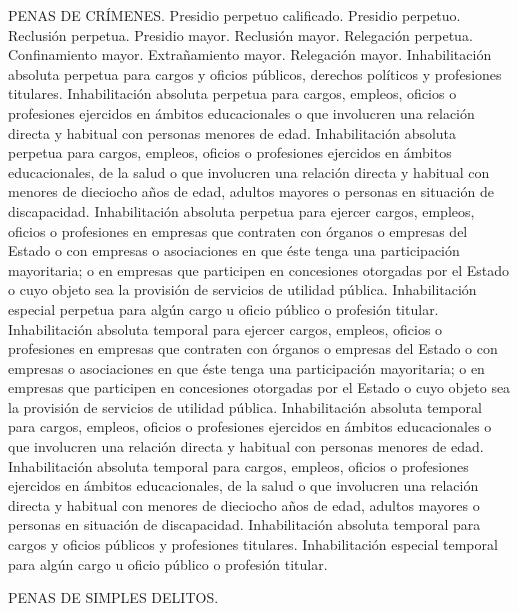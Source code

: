     PENAS DE CRÍMENES.
    Presidio perpetuo calificado.
    Presidio perpetuo.
    Reclusión perpetua.
    Presidio mayor.
    Reclusión mayor.
    Relegación perpetua.
    Confinamiento mayor.
    Extrañamiento mayor.
    Relegación mayor.
    Inhabilitación absoluta perpetua para cargos y oficios públicos, derechos políticos y profesiones titulares.
    Inhabilitación absoluta perpetua para cargos, empleos, oficios o profesiones ejercidos en ámbitos educacionales o que involucren una relación directa y habitual con personas menores de edad.
    Inhabilitación absoluta perpetua para cargos, empleos, oficios o profesiones ejercidos en ámbitos educacionales, de la salud o que involucren una relación directa y habitual con menores de dieciocho años de edad, adultos mayores o personas en situación de discapacidad.
    Inhabilitación absoluta perpetua para ejercer cargos, empleos, oficios o profesiones en empresas que contraten con órganos o empresas del Estado o con empresas o asociaciones en que éste tenga una participación mayoritaria; o en empresas que participen en concesiones otorgadas por el Estado o cuyo objeto sea la provisión de servicios de utilidad pública.
    Inhabilitación especial perpetua para algún cargo u oficio público o profesión titular.
    Inhabilitación absoluta temporal para ejercer cargos, empleos, oficios o profesiones en empresas que contraten con órganos o empresas del Estado o con empresas o asociaciones en que éste tenga una participación mayoritaria; o en empresas que participen en concesiones otorgadas por el Estado o cuyo objeto sea la provisión de servicios de utilidad pública.
    Inhabilitación absoluta temporal para cargos, empleos, oficios o profesiones ejercidos en ámbitos educacionales o que involucren una relación directa y habitual con personas menores de edad.
    Inhabilitación absoluta temporal para cargos, empleos, oficios o profesiones ejercidos en ámbitos educacionales, de la salud o que involucren una relación directa y habitual con menores de dieciocho años de edad, adultos mayores o personas en situación de discapacidad.
    Inhabilitación absoluta temporal para cargos y oficios públicos y profesiones titulares.
    Inhabilitación especial temporal para algún cargo u oficio público o profesión titular.

    PENAS DE SIMPLES DELITOS.

